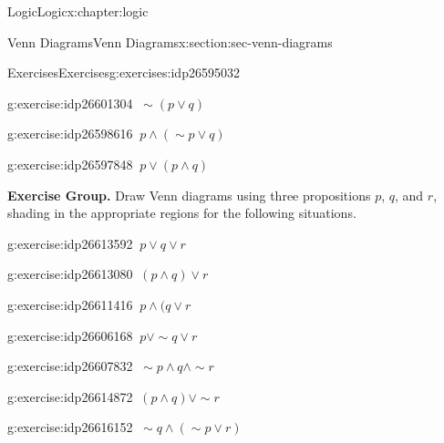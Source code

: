 \documentclass[twoside,10pt,]{book}
\numberwithin{equation}{section}
\begin{document}
\begin{chapterptx}{Logic}{}{Logic}{}{}{x:chapter:logic}
\begin{sectionptx}{Venn Diagrams}{}{Venn Diagrams}{}{}{x:section:sec-venn-diagrams}
\begin{exercises-subsection}{Exercises}{}{Exercises}{}{}{g:exercises:idp26595032}
\begin{exercisegroup}
\begin{divisionexerciseeg}{5}{}{}{g:exercise:idp26601304}%
\(\ \sim\!(p{\vee} q)\)\end{divisionexerciseeg}%
\begin{divisionexerciseeg}{6}{}{}{g:exercise:idp26598616}%
\(\ p{\wedge}(\sim\!{p}{\vee} q)\)\end{divisionexerciseeg}%
\begin{divisionexerciseeg}{7}{}{}{g:exercise:idp26597848}%
\(\ p{\vee}(p{\wedge} q)\)\end{divisionexerciseeg}%
\end{exercisegroup}
\par\medskip\noindent
\par\medskip\noindent%
\textbf{Exercise Group.}\space\space%
Draw Venn diagrams using three propositions \(p\), \(q\), and \(r\), shading in the appropriate regions for the following situations.\begin{exercisegroup}
\begin{divisionexerciseeg}{8}{}{}{g:exercise:idp26613592}%
\(\ p{\vee} q{\vee} r\)\end{divisionexerciseeg}%
\begin{divisionexerciseeg}{9}{}{}{g:exercise:idp26613080}%
\(\ (p{\wedge} q){\vee} r\)\end{divisionexerciseeg}%
\begin{divisionexerciseeg}{10}{}{}{g:exercise:idp26611416}%
\(\ p{\wedge} (q{\vee} r\)\end{divisionexerciseeg}%
\begin{divisionexerciseeg}{11}{}{}{g:exercise:idp26606168}%
\(\ p{\vee}\sim\!{q}{\vee} r\)\end{divisionexerciseeg}%
\begin{divisionexerciseeg}{12}{}{}{g:exercise:idp26607832}%
\(\ \sim\!{p}{\wedge} q{\wedge}\sim\!{r}\)\end{divisionexerciseeg}%
\begin{divisionexerciseeg}{13}{}{}{g:exercise:idp26614872}%
\(\ (p{\wedge} q){\vee}\sim\!{r}\)\end{divisionexerciseeg}%
\begin{divisionexerciseeg}{14}{}{}{g:exercise:idp26616152}%
\(\ \sim\!{q}{\wedge}(\sim\!{p}{\vee} r)\)\end{divisionexerciseeg}%
\end{exercisegroup}
\par\medskip\noindent
\end{exercises-subsection}
%
%
\typeout{************************************************}

\end{sectionptx}
\end{chapterptx}
\end{document}
